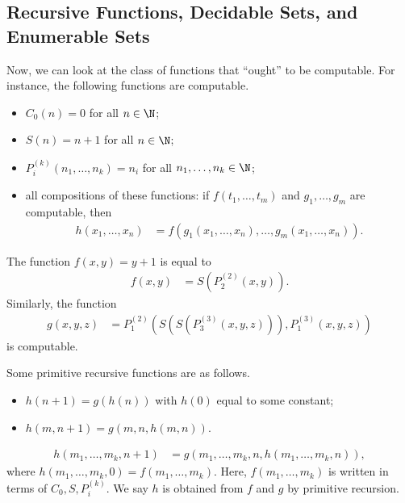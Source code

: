 \documentclass[10pt]{mypackage}
\begin{document}
\subsection{Recursive Functions, Decidable Sets, and Enumerable Sets}%
Now, we can look at the class of functions that ``ought'' to be computable. For instance, the following functions are computable.
\begin{itemize}
  \item $C_0(n) = 0$ for all $n\in \N$;
  \item $S(n) = n+1$ for all $n\in \N$;
  \item $P_{i}^{(k)} \left(n_1,\dots,n_k\right) = n_{i}$ for all $n_1,\dots,n_k\in \N$;
  \item all compositions of these functions: if $f\left(t_1,\dots,t_m\right)$ and $g_1,\dots,g_m$ are computable, then
    \begin{align*}
      h\left(x_1,\dots,x_n\right) &= f\left(g_1\left(x_1,\dots,x_n\right),\dots,g_m\left(x_1,\dots,x_n\right)\right).
    \end{align*}
\end{itemize}
\begin{example}
  The function $f(x,y) = y+1$ is equal to
  \begin{align*}
    f(x,y) &= S\left(P_{2}^{(2)}\left(x,y\right)\right).
  \end{align*}
  Similarly, the function
  \begin{align*}
    g\left(x,y,z\right)  &= P_{1}^{(2)} \left(S\left(S\left(P_{3}^{(3)}\left(x,y,z\right)\right)\right),P_{1}^{(3)}\left(x,y,z\right)\right)
  \end{align*}
  is computable.
\end{example}
Some primitive recursive functions are as follows.
\begin{example}\hfill
  \begin{itemize}
    \item $h\left(n+1\right) = g\left(h\left(n\right)\right)$ with $h(0)$ equal to some constant;
    \item $h\left(m,n+1\right) = g\left(m,n,h\left(m,n\right)\right)$.
  \end{itemize}
\end{example}
\begin{definition}
\begin{align*}
  h\left(m_1,\dots,m_k,n+1\right) &= g\left(m_1,\dots,m_k,n,h\left(m_1,\dots,m_k,n\right)\right),
\end{align*}
where $h\left(m_1,\dots,m_k,0\right) = f\left(m_1,\dots,m_k\right)$. Here, $f\left(m_1,\dots,m_k\right)$ is written in terms of $C_0,S,P_{i}^{(k)}$. We say $h$ is obtained from $f$ and $g$ by primitive recursion.
\end{definition}
\end{document}
